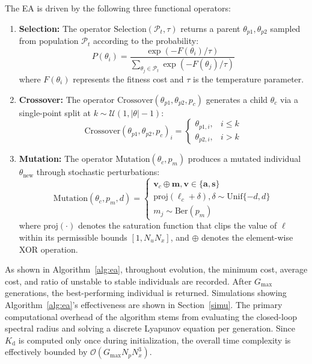 \documentclass[conference]{IEEEtran}
\begin{document}
The EA is driven by the following three functional operators:\begin{enumerate}\item \textbf{Selection:} The operator $\text{Selection}(\mathcal{P}_t, \tau)$ returns a parent ${\theta_{p1}, \theta_{p2}}$ sampled from population $\mathcal{P}_t$ according to the probability:\begin{equation}P(\theta_i) = \frac{\exp(-F(\theta_i)/\tau)}{\sum_{\theta_j \in \mathcal{P}_t} \exp(-F(\theta_j)/\tau)}\end{equation}where $F(\theta_i)$ represents the fitness cost and $\tau$ is the temperature parameter.
\item \textbf{Crossover:} The operator $\text{Crossover}(\theta_{p1}, \theta_{p2}, p_c)$ generates a child $\theta_{c}$ via a single-point split at $k \sim \mathcal{U}(1, |\theta|-1)$:
\begin{equation}
    \text{Crossover}(\theta_{p1}, \theta_{p2}, p_c)_i = 
    \begin{cases} 
    \theta_{p1, i}, & i \le k \\ 
    \theta_{p2, i}, & i > k 
    \end{cases}
\end{equation}

\item \textbf{Mutation:} The operator $\text{Mutation}(\theta_{c}, p_m)$ produces a mutated individual $\theta_{\text{new}}$ through stochastic perturbations:
\begin{equation}
    \text{Mutation}(\theta_{c}, p_m, d) = 
    \begin{cases}
    \mathbf{v}_{c} \oplus \mathbf{m}, \mathbf{v} \in \{\mathbf{a}, \mathbf{s}\} \\
    \text{proj}(\ell_c + \delta), \delta \sim \text{Unif}\{-d, d\}\\
    m_j \sim \text{Ber}(p_m)
    \end{cases} 
\end{equation}
where $\text{proj}(\cdot)$ denotes the saturation function that clips the value of $\ell$ within its permissible bounds $[1, N_u N_x]$, and
$\oplus$ denotes the element-wise XOR operation.

\end{enumerate}

As shown in Algorithm~\ref{alg:ea}, throughout evolution, the minimum cost, average cost, and ratio of unstable to stable
individuals are recorded. After $G_{\max}$ generations, the best-performing individual is returned. Simulations showing Algorithm~\ref{alg:ea}'s effectiveness are shown in
Section~\ref{simu}. The primary computational overhead of the algorithm stems from evaluating the closed-loop spectral radius and solving a discrete Lyapunov equation per generation. Since $K_\mathrm{d}$ is computed only once during initialization, the overall time complexity is effectively bounded by $\mathcal{O}(G_{\max} N_p N_x^3)$. 
\end{document}
